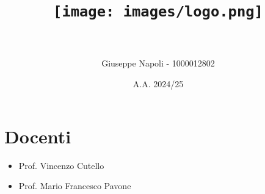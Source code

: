 \documentclass[12pt]{article}
\title{
  \texttt{[image: images/logo.png]}\\
  \vspace{1cm}
  \materia\\
  \projectName
}
\author{Giuseppe Napoli - 1000012802}
\date{A.A. 2024/25}
\newcommand{\docenteUno}{Prof. Vincenzo Cutello}
\newcommand{\docenteDue}{Prof. Mario Francesco Pavone}
\begin{document}
\maketitle

\section*{Docenti}
\begin{itemize}
  \item \docenteUno
  \item \docenteDue
\end{itemize}

\newpage
\tableofcontents
\newpage

\newpage

\newpage

\newpage

\newpage

\end{document}
